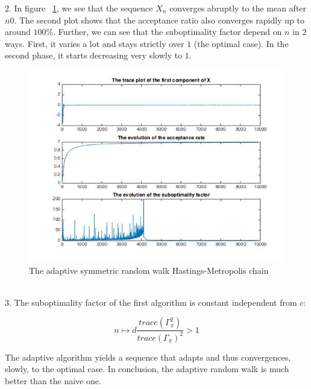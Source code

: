 	2.  In figure ~\ref{arwHM}, we see that the sequence $X_n$ converges abruptly to the mean after $n0$. The second plot shows that the acceptance ratio also converges rapidly up to around $100\%$. Further, we can see that the suboptimality factor depend on $n$ in $2$ ways. First, it varies a lot and stays strictly over $1$ (the optimal case). In the second phase, it starts decreasing very slowly to $1$.
	\begin{figure}[H]
		\centering
		\includegraphics[scale=.5]{figures/arwHM}
		\caption{The adaptive symmetric random walk Hastings-Metropolis chain}
		\label{arwHM}
	\end{figure}
	~\\
	
	3. The suboptimality factor of the first algorithm is constant independent from $c$:
	
	$$n \mapsto d\frac{trace(\Gamma_{\pi} ^2) }{trace(\Gamma_{\pi})^2}>1$$
	
	The adaptive algorithm yields a sequence that adapts and thus convergences, slowly, to the optimal case. In conclusion, the adaptive random walk is much better than the naive one.
	
	

